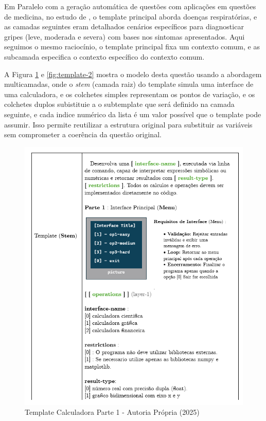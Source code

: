 Em Paralelo com a geração automática de questões com aplicações em questões de medicina, no estudo de \parencite{gierl2021}, o template principal aborda doenças respiratórias, e as camadas seguintes eram detalhados cenários específicos para diagnosticar gripes (leve, moderada e severa) com bases nos sintomas apresentados. Aqui seguimos o mesmo raciocínio, o template principal fixa um contexto comum, e as subcamada especifica o contexto específico do contexto comum.

A Figura \ref{fig:template-1} e \ref{fig:template-2} mostra o modelo desta questão usando a abordagem multicamadas, onde o \textit{stem} (camada raiz) do template simula uma interface de uma calculadora, e os colchetes simples representam os pontos de variação, e os colchetes duplos subistituie a o subtemplate que será definido na camada seguinte, e cada indice numérico da lista é um valor possível que o template pode assumir. Isso permite reutilizar a estrutura original para substituir as variáveis sem comprometer a coerência da questão original.

\begin{figure}
    \centering
    \includegraphics[width=12cm]{./imagens/capitulo4/template-1.png}
    \caption{Template Calculadora Parte 1 - Autoria Própria (2025)}
    \label{fig:template-1}
\end{figure}

